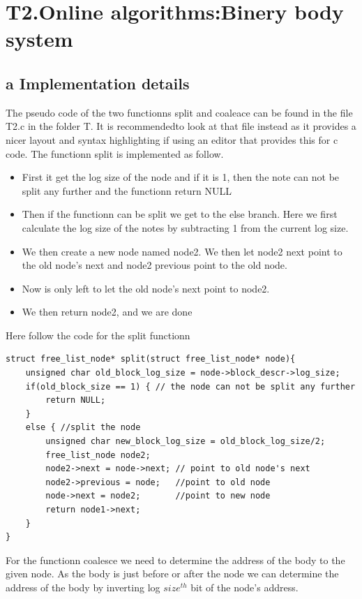 \documentclass[a4paper,12pt,danish]{report}
\begin{document}
\newpage
\section{T2.Online algorithms:Binery body system}
\subsection{a Implementation details}
The pseudo code of the two functionns split and coaleace can be found in the file
T2.c in the folder T. It is recommendedto look at that file instead as it
provides a nicer layout and syntax highlighting if using an editor that provides this for c
code. 
The functionn split is implemented as follow.

\begin{itemize}
  \item First it get the log size of the node and if it is 1, then the note can
  not be split any further and the functionn return NULL
  \item Then if the functionn can be split we get to the else branch. Here we
  first calculate the log size of the notes by subtracting 1 from the
  current log size.
  \item We then create a new node named node2. We then let node2 next
  point to the old node's next and node2 previous point to the old node.
  \item Now is only left to let the old node's next point to node2.
  \item We then return node2, and we are done 
\end{itemize}
Here follow the code for the split functionn
\begin{verbatim} 
struct free_list_node* split(struct free_list_node* node){
    unsigned char old_block_log_size = node->block_descr->log_size;
    if(old_block_size == 1) { // the node can not be split any further
        return NULL;
    }
    else { //split the node
        unsigned char new_block_log_size = old_block_log_size/2; 
        free_list_node node2;
        node2->next = node->next; // point to old node's next
        node2->previous = node;   //point to old node
        node->next = node2;       //point to new node 
        return node1->next;
    }
}
\end{verbatim}

For the functionn coalesce we need to determine the address of the body to the
given node. As the body is just before or after the node we can determine
the address of the body by inverting log $size^{th}$  bit of the node's address.
\end{document}
